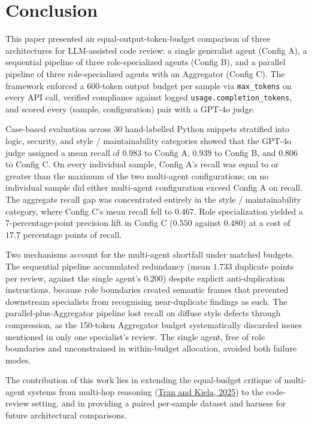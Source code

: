\documentclass[pdflatex,sn-mathphys-num]{sn-jnl}
\newcommand{\apa}[2]{\hyperlink{cite.#1}{#2}}
\theoremstyle{thmstyleone}
\theoremstyle{thmstyletwo}
\theoremstyle{thmstylethree}
\begin{document}
\section{Conclusion}\label{sec:conclusion}

This paper presented an equal-output-token-budget comparison of three architectures for LLM-assisted code review: a single generalist agent (Config A), a sequential pipeline of three role-specialized agents (Config B), and a parallel pipeline of three role-specialized agents with an Aggregator (Config C). The framework enforced a 600-token output budget per sample via \texttt{max\_tokens} on every API call, verified compliance against logged \texttt{usage.completion\_tokens}, and scored every (sample, configuration) pair with a GPT-4o judge.

Case-based evaluation across 30 hand-labelled Python snippets stratified into logic, security, and style / maintainability categories showed that the GPT-4o judge assigned a mean recall of $0.983$ to Config A, $0.939$ to Config B, and $0.806$ to Config C. On every individual sample, Config A's recall was equal to or greater than the maximum of the two multi-agent configurations; on no individual sample did either multi-agent configuration exceed Config A on recall. The aggregate recall gap was concentrated entirely in the style / maintainability category, where Config C's mean recall fell to $0.467$. Role specialization yielded a $7$-percentage-point precision lift in Config C ($0.550$ against $0.480$) at a cost of $17.7$ percentage points of recall.

Two mechanisms account for the multi-agent shortfall under matched budgets. The sequential pipeline accumulated redundancy (mean $1.733$ duplicate points per review, against the single agent's $0.200$) despite explicit anti-duplication instructions, because role boundaries created semantic frames that prevented downstream specialists from recognising near-duplicate findings as such. The parallel-plus-Aggregator pipeline lost recall on diffuse style defects through compression, as the 150-token Aggregator budget systematically discarded issues mentioned in only one specialist's review. The single agent, free of role boundaries and unconstrained in within-budget allocation, avoided both failure modes.

The contribution of this work lies in extending the equal-budget critique of multi-agent systems from multi-hop reasoning (\apa{tran2025}{Tran and Kiela, 2025}) to the code-review setting, and in providing a paired per-sample dataset and harness for future architectural comparisons.
\end{document}
